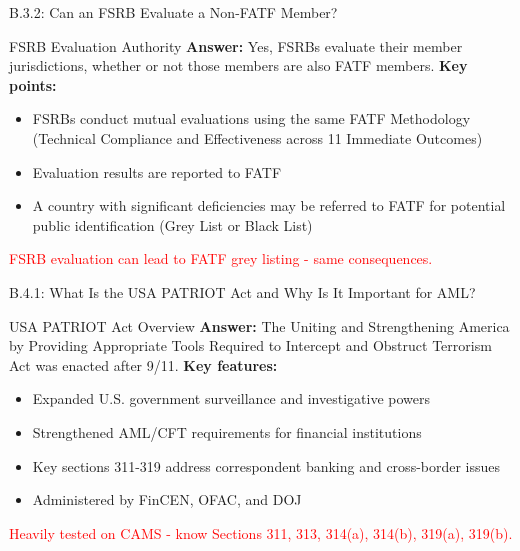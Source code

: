 \documentclass{beamer}
\begin{document}
	\begin{frame}{B.3.2: Can an FSRB Evaluate a Non-FATF Member?}
		\begin{block}{FSRB Evaluation Authority}
			\textbf{Answer:} Yes, FSRBs evaluate their member jurisdictions, whether or not those members are also FATF members.
			\vspace{0.2cm}
			\textbf{Key points:}
			\begin{itemize}
				\item FSRBs conduct mutual evaluations using the same FATF Methodology (Technical Compliance and Effectiveness across 11 Immediate Outcomes)
				\item Evaluation results are reported to FATF
				\item A country with significant deficiencies may be referred to FATF for potential public identification (Grey List or Black List)
			\end{itemize}
			\textcolor{red}{FSRB evaluation can lead to FATF grey listing - same consequences.}
		\end{block}
	\end{frame}
	
	
	\begin{frame}{B.4.1: What Is the USA PATRIOT Act and Why Is It Important for AML?}
		\begin{block}{USA PATRIOT Act Overview}
			\textbf{Answer:} The Uniting and Strengthening America by Providing Appropriate Tools Required to Intercept and Obstruct Terrorism Act was enacted after 9/11.
			\vspace{0.2cm}
			\textbf{Key features:}
			\begin{itemize}
				\item Expanded U.S. government surveillance and investigative powers
				\item Strengthened AML/CFT requirements for financial institutions
				\item Key sections 311-319 address correspondent banking and cross-border issues
				\item Administered by FinCEN, OFAC, and DOJ
			\end{itemize}
			\textcolor{red}{Heavily tested on CAMS - know Sections 311, 313, 314(a), 314(b), 319(a), 319(b).}
		\end{block}
	\end{frame}
	
\end{document}
